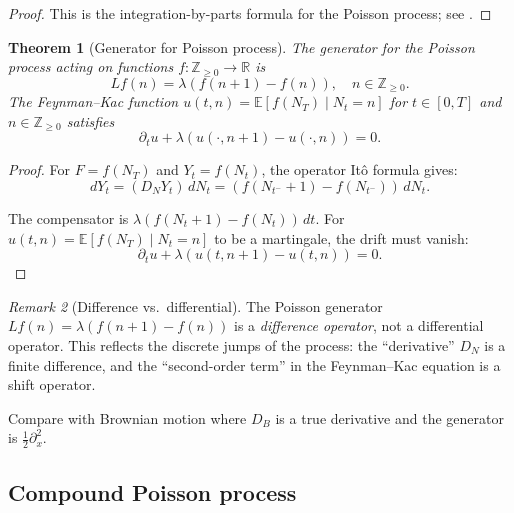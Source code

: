 \documentclass[12pt]{article}
\theoremstyle{plain}
\newtheorem{theorem}{Theorem}[section]
\theoremstyle{definition}
\theoremstyle{remark}
\newtheorem{remark}[theorem]{Remark}
\newcommand{\E}{\mathbb{E}}
\newcommand{\R}{\mathbb{R}}
\newcommand{\Z}{\mathbb{Z}}
\begin{document}
\begin{proof}
This is the integration-by-parts formula for the Poisson process; see \cite{DiNunnoOksendalProske2009}.
\end{proof}

\begin{theorem}[Generator for Poisson process]\label{thm:Poisson-generator}
The generator for the Poisson process acting on functions $f: \Z_{\geq 0} \to \R$ is
\begin{equation}\label{eq:Poisson-generator}
Lf(n) = \lambda(f(n+1) - f(n)), \quad n \in \Z_{\geq 0}.
\end{equation}
The Feynman--Kac function $u(t,n) = \E[f(N_T) \mid N_t = n]$ for $t \in [0,T]$ and $n \in \Z_{\geq 0}$ satisfies
\begin{equation}\label{eq:Poisson-FK}
\partial_t u + \lambda(u(\cdot, n+1) - u(\cdot, n)) = 0.
\end{equation}
\end{theorem}

\begin{proof}
For $F = f(N_T)$ and $Y_t = f(N_t)$, the operator It\^{o} formula gives:
\begin{equation}\label{eq:Poisson-ito}
dY_t = (D_N Y_t) \, dN_t = (f(N_{t^-} + 1) - f(N_{t^-})) \, dN_t.
\end{equation}

The compensator is $\lambda(f(N_t + 1) - f(N_t)) \, dt$. For $u(t,n) = \E[f(N_T) \mid N_t = n]$ to be a martingale, the drift must vanish:
\begin{equation}\label{eq:Poisson-martingale}
\partial_t u + \lambda(u(t, n+1) - u(t,n)) = 0.
\end{equation}
\end{proof}

\begin{remark}[Difference vs.\ differential]\label{rmk:difference-vs-differential}
The Poisson generator $Lf(n) = \lambda(f(n+1) - f(n))$ is a \emph{difference operator}, not a differential operator. This reflects the discrete jumps of the process: the ``derivative'' $D_N$ is a finite difference, and the ``second-order term'' in the Feynman--Kac equation is a shift operator.

Compare with Brownian motion where $D_B$ is a true derivative and the generator is $\frac{1}{2}\partial_x^2$.
\end{remark}

\subsection{Compound Poisson process}
\end{document}
